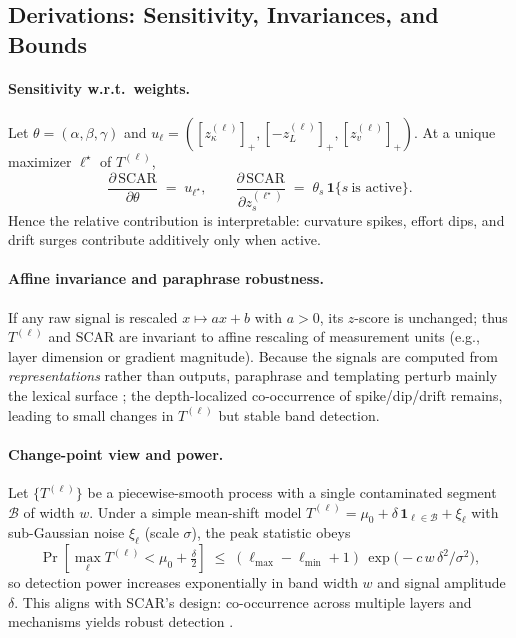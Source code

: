 \documentclass[11pt]{article}
\begin{document}
\vspace{0.6em}
\subsection{Derivations: Sensitivity, Invariances, and Bounds}
\label{subsec:scar-derivations}

\paragraph{Sensitivity w.r.t.\ weights.}
Let $\theta=(\alpha,\beta,\gamma)$ and $u_\ell=([z_\kappa^{(\ell)}]_+,[-z_L^{(\ell)}]_+,[z_v^{(\ell)}]_+)$.
At a unique maximizer $\ell^\star$ of $T^{(\ell)}$,
\[
\frac{\partial\,\mathrm{SCAR}}{\partial \theta}
\;=\;
u_{\ell^\star},
\qquad
\frac{\partial\,\mathrm{SCAR}}{\partial z_s^{(\ell^\star)}}\;=\;\theta_s\,\mathbf{1}\{s\ \text{is active}\}.
\]
Hence the relative contribution is interpretable: curvature spikes, effort dips, and drift surges contribute additively only when active.

\paragraph{Affine invariance and paraphrase robustness.}
If any raw signal is rescaled $x\mapsto ax+b$ with $a>0$, its $z$-score is unchanged; thus $T^{(\ell)}$ and $\mathrm{SCAR}$ are invariant to affine rescaling of measurement units (e.g., layer dimension or gradient magnitude). Because the signals are computed from \emph{representations} rather than outputs, paraphrase and templating perturb mainly the lexical surface \citep{ribeiro2020checklist,iyyer2018scpn}; the depth-localized co-occurrence of spike/dip/drift remains, leading to small changes in $T^{(\ell)}$ but stable band detection.

\paragraph{Change-point view and power.}
Let $\{T^{(\ell)}\}$ be a piecewise-smooth process with a single contaminated segment $\mathcal{B}$ of width $w$. Under a simple mean-shift model $T^{(\ell)}=\mu_0+\delta\,\mathbf{1}_{\ell\in\mathcal{B}}+\xi_\ell$ with sub-Gaussian noise $\xi_\ell$ (scale $\sigma$), the peak statistic obeys
\[
\Pr\!\left[\max_\ell T^{(\ell)} < \mu_0 + \tfrac{\delta}{2}\right]
\;\le\;
(\ell_{\max}-\ell_{\min}+1)\,\exp\!\big(-c\,w\,\delta^2/\sigma^2\big),
\]
so detection power increases exponentially in band width $w$ and signal amplitude $\delta$. This aligns with SCAR’s design: co-occurrence across multiple layers and mechanisms yields robust detection \citep{truong2020cpd}.
\end{document}

